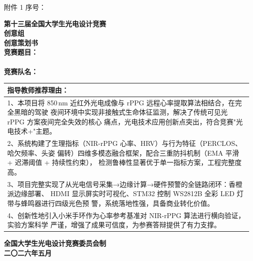 \documentclass[a4paper,12pt]{article}
\begin{document}
\begin{titlepage}
  \thispagestyle{empty}
  \vspace*{0.8cm}
  \noindent 附件 1 \hfill \Large 序号：\underline{\makebox[3cm]{\quad}}\\[2cm]

  \begin{center}
    {\Huge \textbf{第十三届全国大学生光电设计竞赛}}\\[0.7cm]
    {\Huge \textbf{创意组}}\\[2cm]
    {\fontsize{34pt}{40pt}\selectfont \textbf{创意策划书}}\\[2.5cm]

    {\large \textbf{竞赛题目：}}\underline{}\\[0.3cm]
    \hfill\underline{}\\[0.8cm]
    {\large \textbf{竞赛队名：}}\underline{}\\[1.8cm]
  \end{center}

  \begin{table}[H]
    \centering
    \renewcommand{\arraystretch}{2.0}
    \begin{tabular}{|p{15cm}|}
      \hline
      \textbf{指导教师推荐理由：}\\
      \hline
      1、本项目将 850\,nm 近红外光电成像与 rPPG 远程心率提取算法相结合，在完全黑暗的驾驶
      夜间环境中实现非接触式生命体征监测，解决了传统可见光 rPPG 方案夜间完全失效的核心
      痛点，光电技术应用创新点突出，符合竞赛"光电技术+"主题。\\
      \hline
      2、系统构建了生理指标（NIR-rPPG 心率、HRV）与行为特征（PERCLOS、哈欠频率、头姿
      偏转）四维多模态融合框架，配合三重防抖机制（EMA 平滑 + 迟滞阈值 + 持续性约束），
      检测鲁棒性显著优于单一指标方案，工程完整度高。\\
      \hline
      3、项目完整实现了从光电信号采集→边缘计算→硬件预警的全链路闭环：香橙派边缘部署、
      HDMI 显示屏实时可视化、STM32 控制 WS2812B 全彩 LED 灯带与蜂鸣器进行四级光色预
      警，系统落地性强，具备商业转化价值。\\
      \hline
      4、创新性地引入小米手环作为心率参考基准对 NIR-rPPG 算法进行横向验证，实验方案科学
      严谨，增强了成果可信度，为参赛答辩提供了有力支撑。\\
      \hline
    \end{tabular}
  \end{table}

  \vfill
  \begin{center}
    {\large \textbf{全国大学生光电设计竞赛委员会制}}\\[0.4cm]
    {\large \textbf{二〇二六年五月}}
  \end{center}
\end{titlepage}
\end{document}
